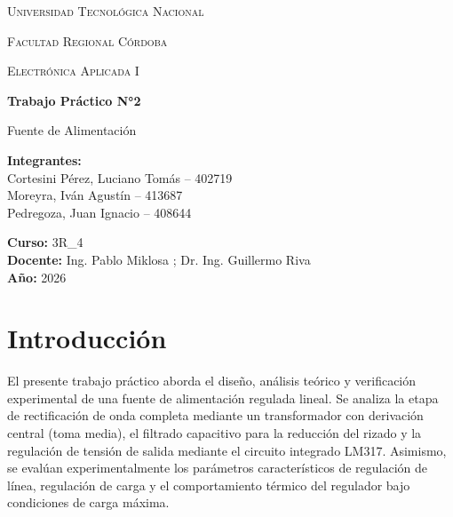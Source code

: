 \documentclass[12pt,a4paper]{article}
\begin{document}
\begin{titlepage}
    \centering

    {\scshape\LARGE Universidad Tecnológica Nacional \par}
    \vspace{0.3cm}
    {\scshape\Large Facultad Regional Córdoba \par}
    \vspace{1.5cm}

    {\scshape\Large Electrónica Aplicada I \par}
    \vspace{2cm}

    {\Huge\bfseries Trabajo Práctico N°2 \par}
    \vspace{0.5cm}
    {\LARGE Fuente de Alimentación \par}

    \vspace{2cm}

    \begin{flushleft}
    \textbf{Integrantes:} \\
    Cortesini Pérez, Luciano Tomás -- 402719 \\
    Moreyra, Iván Agustín -- 413687 \\
    Pedregoza, Juan Ignacio  -- 408644 \\

    \vspace{0.5cm}

    \textbf{Curso:} 3R\_4 \\
    \textbf{Docente:} Ing. Pablo Miklosa ; Dr. Ing. Guillermo Riva  \\
    \textbf{Año:} 2026 \\
    \end{flushleft}

    \vfill

\end{titlepage}
\thispagestyle{empty}

\vspace{1cm}

\tableofcontents
\newpage
{}

\section{Introducción}
El presente trabajo práctico aborda el diseño, análisis teórico y verificación experimental de una fuente de alimentación
regulada lineal. Se analiza la etapa de rectificación de onda completa mediante un transformador con derivación central
(toma media), el filtrado capacitivo para la reducción del rizado y la regulación de tensión de salida mediante el
circuito integrado LM317. Asimismo, se evalúan experimentalmente los parámetros característicos de regulación de línea,
regulación de carga y el comportamiento térmico del regulador bajo condiciones de carga máxima.
\end{document}
